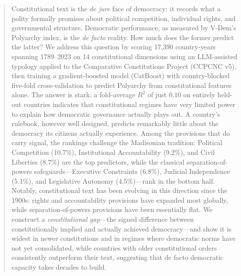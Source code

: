 \documentclass[9pt,twoside]{pnas-new}
\begin{document}
\begin{abstract}
Constitutional text is the \emph{de jure} face of democracy: it records what a polity formally promises about political competition, individual rights, and governmental structure. Democratic performance, as measured by V-Dem's Polyarchy index, is the \emph{de facto} reality. How much does the former predict the latter? We address this question by scoring 17,390 country-years spanning 1789--2023 on 14 constitutional dimensions using an LLM-assisted typology applied to the Comparative Constitutions Project (CCPCNC v5), then training a gradient-boosted model (CatBoost) with country-blocked five-fold cross-validation to predict Polyarchy from constitutional features alone. The answer is stark: a fold-average $R^2$ of just $0.10$ on entirely held-out countries indicates that constitutional regimes have very limited power to explain how democratic governance actually plays out. A country's rulebook, however well designed, predicts remarkably little about the democracy its citizens actually experience. Among the provisions that do carry signal, the rankings challenge the Madisonian tradition: Political Competition (10.7\%), Institutional Accountability (9.2\%), and Civil Liberties (8.7\%) are the top predictors, while the classical separation-of-powers safeguards---Executive Constraints (6.8\%), Judicial Independence (5.1\%), and Legislative Autonomy (4.5\%)---rank in the bottom half. Notably, constitutional text has been evolving in this direction since the 1900s: rights and accountability provisions have expanded most globally, while separation-of-powers provisions have been essentially flat. We construct a \emph{constitutional gap}---the signed difference between constitutionally implied and actually achieved democracy---and show it is widest in newer constitutions and in regimes where democratic norms have not yet consolidated, while countries with older constitutional orders consistently outperform their text, suggesting that de facto democratic capacity takes decades to build.
\end{abstract}


\maketitle
\thispagestyle{firststyle}
\end{document}
